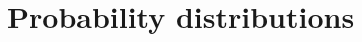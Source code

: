 \documentclass[usenames,dvipsnames,smaller]{beamer}
\newcommand{\lt}{\left}
\newcommand{\rt}{\right}
\newcommand{\?}{\stackrel{?}{=}}
\newcommand{\fr}{\frac}
\newcommand{\gr}{\color{green!40!black}}
\begin{document}




  


\section{Probability distributions}
\end{document}
